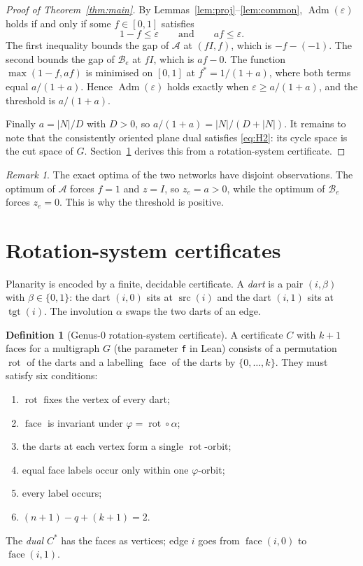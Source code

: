 \documentclass[11pt]{amsart}
\theoremstyle{plain}
\theoremstyle{definition}
\newtheorem{definition}{Definition}
\theoremstyle{remark}
\newtheorem{remark}{Remark}
\newcommand{\src}{\operatorname{src}}
\newcommand{\tgt}{\operatorname{tgt}}
\newcommand{\face}{\operatorname{face}}
\newcommand{\rot}{\operatorname{rot}}
\newcommand{\Adm}{\operatorname{Adm}}
\newcommand{\code}[1]{\texttt{#1}}
\begin{document}
\begin{proof}[Proof of Theorem~\ref{thm:main}]
By Lemmas~\ref{lem:proj}--\ref{lem:common}, $\Adm(\varepsilon)$ holds if and only if some $f\in[0,1]$ satisfies
\[
1-f\le\varepsilon\qquad\text{and}\qquad af\le\varepsilon .
\]
The first inequality bounds the gap of $\mathcal A$ at $(fI,f)$, which is $-f-(-1)$. The second bounds the gap of
$\mathcal B_e$ at $fI$, which is $af-0$. The function $\max(1-f,af)$ is minimised on $[0,1]$ at $f^*=1/(1+a)$,
where both terms equal $a/(1+a)$. Hence $\Adm(\varepsilon)$ holds exactly when $\varepsilon\ge a/(1+a)$, and the
threshold is $a/(1+a)$.

Finally $a=|N|/D$ with $D>0$, so $a/(1+a)=|N|/(D+|N|)$. It remains to note that the consistently oriented plane dual satisfies
\eqref{eq:H2}: its cycle space is the cut space of $G$. Section~\ref{sec:cert} derives this from a rotation-system
certificate.
\end{proof}

\begin{remark}
The exact optima of the two networks have disjoint observations. The optimum of $\mathcal A$ forces $f=1$ and
$z=I$, so $z_e=a>0$, while the optimum of $\mathcal B_e$ forces $z_e=0$. This is why the threshold is positive.
\end{remark}

\section{Rotation-system certificates}\label{sec:cert}

Planarity is encoded by a finite, decidable certificate. A \emph{dart} is a pair $(i,\beta)$ with $\beta\in\{0,1\}$:
the dart $(i,0)$ sits at $\src(i)$ and the dart $(i,1)$ sits at $\tgt(i)$. The involution $\alpha$ swaps the two
darts of an edge.

\begin{definition}[Genus-$0$ rotation-system certificate]\label{def:rotcert}
A certificate $C$ with $k+1$ faces for a multigraph $G$ (the parameter \code{f} in Lean) consists of a permutation $\rot$ of the darts and a labelling
$\face$ of the darts by $\{0,\dots,k\}$. They must satisfy six conditions:
\begin{enumerate}\renewcommand{\labelenumi}{(\roman{enumi})}
\item $\rot$ fixes the vertex of every dart;
\item $\face$ is invariant under $\varphi=\rot\circ\alpha$;
\item the darts at each vertex form a single $\rot$-orbit;
\item equal face labels occur only within one $\varphi$-orbit;
\item every label occurs;
\item $(n+1)-q+(k+1)=2$.
\end{enumerate}
The \emph{dual} $C^\ast$ has the faces as vertices; edge $i$ goes from $\face(i,0)$ to $\face(i,1)$.
\end{definition}
\end{document}
